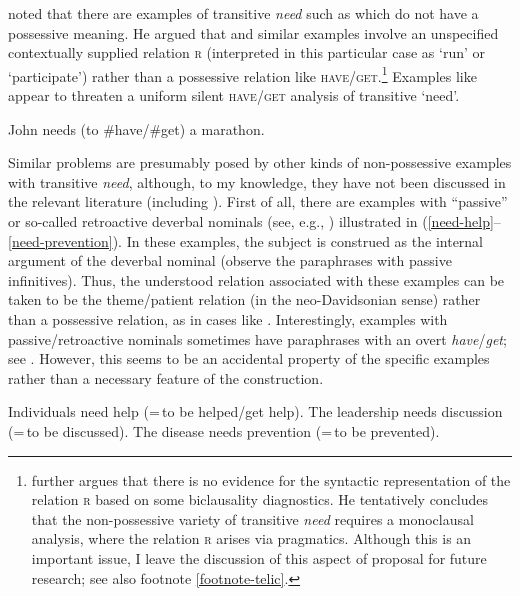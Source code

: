 \documentclass[output=paper]{langscibook}
\begin{document}
\citet{Schwarz2006} noted that there are examples of transitive \textit{need} such as  which do not have a possessive meaning. He argued that  and similar examples involve an unspecified contextually supplied relation \textsc{r} (interpreted in this particular case as `run' or `participate') rather than a possessive relation like \textsc{have/get}.\footnote{\citet{Schwarz2006} further argues that there is no evidence for the syntactic representation of the relation \textsc{r} based on some biclausality diagnostics. He tentatively concludes that the non-possessive variety of transitive \textit{need} requires a monoclausal analysis, where the relation \textsc{r} arises via pragmatics. Although this is an important issue, I leave the discussion of this aspect of  proposal for future research; see also footnote \ref{footnote-telic}.\label{footnote-pragmatic}} Examples like  appear to threaten a uniform silent \textsc{have/get} analysis of transitive `need'.

\ea John needs (to \#have/\#get) a marathon.\hfill \citep[272]{Schwarz2006} \label{marathon}
\z

\noindent Similar problems are presumably posed by other kinds of non-possessive examples with transitive \textit{need}, although, to my knowledge, they have not been discussed in the relevant literature (including \citealt{Schwarz2006}). First of all, there are examples with ``passive'' or so-called retroactive deverbal nominals (see, e.g., \citealt{Safir1991,Roeper2000}) illustrated in (\ref{need-help}--\ref{need-prevention}). In these examples, the subject is construed as the internal argument of the deverbal nominal (observe the paraphrases with passive infinitives). Thus, the understood relation associated with these examples can be taken to be the theme/patient relation (in the neo-Davidsonian sense) rather than a possessive relation, as in cases like . Interestingly, examples with passive/retroactive nominals sometimes have paraphrases with an overt \textit{have}/\textit{get}; see . However, this seems to be an accidental property of the specific examples rather than a necessary feature of the construction.

\ea\label{retroactive}
\ea Individuals need help (=\,to be helped\slash get help).\label{need-help}
\ex The leadership needs discussion (=\,to be discussed).
\ex The disease needs prevention (=\,to be prevented).\label{need-prevention} \hfill \citep[306]{Roeper2000}
\z \z
\end{document}
